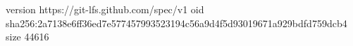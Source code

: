 version https://git-lfs.github.com/spec/v1
oid sha256:2a7138e6ff36ed7e577457993523194c56a9d4f5d93019671a929bdfd759dcb4
size 44616
